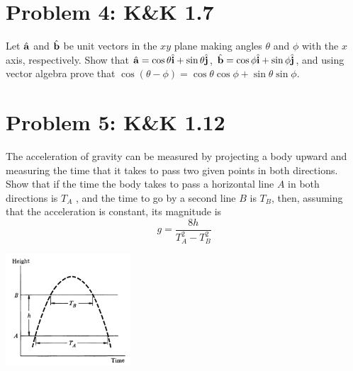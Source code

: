 \documentclass[problems]{esg8012pset}
\providecommand{\uvec}[1]{{\hat{\bf{#1}}}}
\begin{document}
\section*{Problem 4: K\&K 1.7}
  Let $\uvec a$ and $\uvec b$ be unit vectors in the $xy$ plane making angles $\theta$ and $\phi$ with the $x$ axis,
  respectively. Show that $\uvec a = \cos\theta\uvec i + \sin\theta\uvec j$, $\uvec b = \cos\phi\uvec i + \sin\phi\uvec j$, and using vector algebra prove
that $\cos(\theta -\phi ) = \cos\theta \cos\phi + \sin\theta \sin\phi$.
\section*{Problem 5: K\&K 1.12}
  The acceleration of gravity can be measured by projecting a body upward and measuring the
  time that it takes to pass two given points in both directions. Show that if the time the body takes
  to pass a horizontal line $A$ in both directions is $T_A$ , and the time to go by a second line $B$ is $T_B$,
  then, assuming that the acceleration is constant, its magnitude is
  $$g = \frac{8h}{T_A^2 - T_B^2}$$
  \begin{center}\includegraphics[width=0.35\textwidth]{ps01_1}\end{center}
\end{document}
